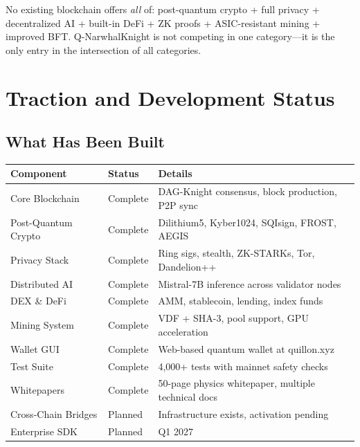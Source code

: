 \documentclass[11pt,a4paper]{article}
\begin{document}
\begin{keyinsight}
No existing blockchain offers \textit{all} of: post-quantum crypto + full privacy + decentralized AI + built-in DeFi + ZK proofs + ASIC-resistant mining + improved BFT. Q-NarwhalKnight is not competing in one category---it is the only entry in the intersection of all categories.
\end{keyinsight}


\section{Traction and Development Status}

\subsection{What Has Been Built}

\begin{center}
\begin{tabular}{@{}p{5cm}p{2cm}p{7cm}@{}}
\toprule
\textbf{Component} & \textbf{Status} & \textbf{Details} \\
\midrule
Core Blockchain & \textcolor{qnkgreen}{Complete} & DAG-Knight consensus, block production, P2P sync \\
Post-Quantum Crypto & \textcolor{qnkgreen}{Complete} & Dilithium5, Kyber1024, SQIsign, FROST, AEGIS \\
Privacy Stack & \textcolor{qnkgreen}{Complete} & Ring sigs, stealth, ZK-STARKs, Tor, Dandelion++ \\
Distributed AI & \textcolor{qnkgreen}{Complete} & Mistral-7B inference across validator nodes \\
DEX \& DeFi & \textcolor{qnkgreen}{Complete} & AMM, stablecoin, lending, index funds \\
Mining System & \textcolor{qnkgreen}{Complete} & VDF + SHA-3, pool support, GPU acceleration \\
Wallet GUI & \textcolor{qnkgreen}{Complete} & Web-based quantum wallet at quillon.xyz \\
Test Suite & \textcolor{qnkgreen}{Complete} & 4,000+ tests with mainnet safety checks \\
Whitepapers & \textcolor{qnkgreen}{Complete} & 50-page physics whitepaper, multiple technical docs \\
Cross-Chain Bridges & \textcolor{qnkamber}{Planned} & Infrastructure exists, activation pending \\
Enterprise SDK & \textcolor{qnkamber}{Planned} & Q1 2027 \\
\bottomrule
\end{tabular}
\end{center}
\end{document}
